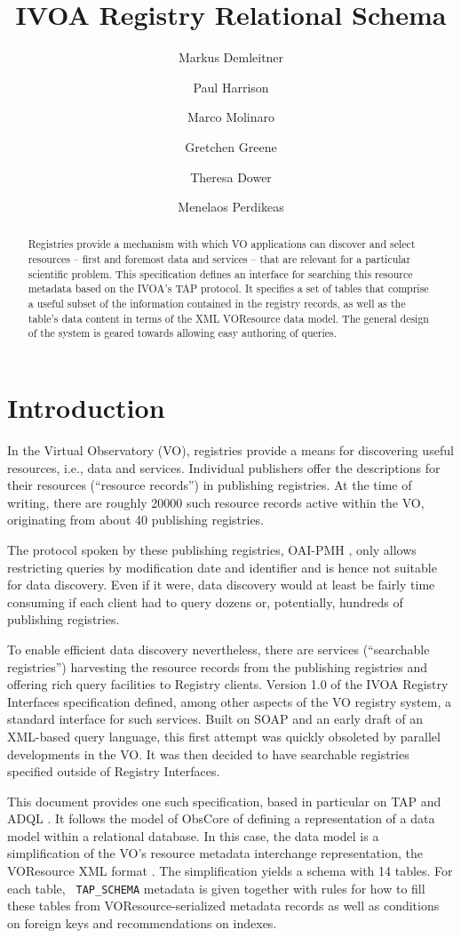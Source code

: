 \documentclass[11pt,a4paper]{ivoa}
\author[http://www.ivoa.net/cgi-bin/twiki/bin/view/IVOA/MarkusDemleitner]{Markus Demleitner}
\author[http://www.ivoa.net/cgi-bin/twiki/bin/view/IVOA/PaulHarrison]{Paul Harrison}
\author[http://www.ivoa.net/cgi-bin/twiki/bin/view/IVOA/MarcoMolinaro]{Marco Molinaro}
\author[http://www.ivoa.net/cgi-bin/twiki/bin/view/IVOA/GretchenGreene]{Gretchen Greene}
\author[http://www.ivoa.net/cgi-bin/twiki/bin/view/IVOA/TheresaDower]{Theresa Dower}
\author[http://wiki.ivoa.net/twiki/bin/view/IVOA/MenelaosPerdikeas]{Menelaos Perdikeas}
\title{IVOA Registry Relational Schema}
\newcommand{\tapent}[1]{\texttt{\color{tapcolor} #1}}
\begin{document}
\begin{abstract}
Registries provide a mechanism with which VO applications can
discover and select resources -- first and foremost data and
services -- that are relevant for a particular scientific problem.
This specification defines  an interface for searching this resource
metadata based on the IVOA's TAP protocol.  It specifies a set of tables
that comprise a useful subset of the information contained in the
registry records, as well as the table's data content in terms of the
XML VOResource data model.  The general design of the system is geared
towards allowing easy authoring of queries.
\end{abstract}


\section{Introduction}

\label{intro}

In the Virtual Observatory (VO), registries provide a means for
discovering useful resources, i.e., data and services.  Individual
publishers offer the descriptions for their resources (``resource
records'') in publishing registries.  At the time of writing, there are
roughly 20000 such resource records active within the VO, originating
from about 40 publishing registries.

The protocol spoken by these
publishing registries, OAI-PMH \citep{std:OAIPMH}, only allows restricting queries by
modification date and identifier and is hence not suitable for data discovery.
Even if it were, data discovery would at least be fairly time consuming if
each client had to query dozens or, potentially, hundreds of
publishing registries.

To enable efficient data discovery nevertheless, there are services
(``searchable registries'') harvesting the
resource records from the publishing registries and offering rich query
facilities to Registry clients.
Version 1.0 of the IVOA Registry
Interfaces specification \citep{2009ivoa.spec.1104B} defined, among other aspects of
the VO registry system, a standard interface for such services.
Built on SOAP and an early draft of an XML-based query language,
this first attempt was quickly obsoleted by parallel
developments in the VO.  It was then decided to have searchable
registries specified outside of Registry Interfaces.

This document provides one such specification, based in particular on TAP \citep{2010ivoa.spec.0327D}
and ADQL \citep{2023ivoa.spec.1215M}.  It follows the model of ObsCore
\citep{2017ivoa.spec.0509L} of defining a representation of a data model
within a relational database.  In this case, the data model is a
simplification of the VO's resource metadata interchange representation,
the VOResource XML format \citep{2018ivoa.spec.0625P}.  The simplification
yields a schema with 14 tables.  For each table, \tapent{TAP\_SCHEMA} metadata is given together
with rules for how to fill these tables from VOResource-serialized
metadata records as well as conditions on foreign keys and
recommendations on indexes.
\end{document}
